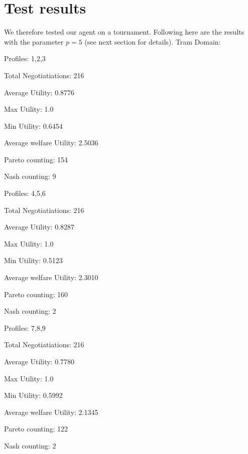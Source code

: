 \documentclass[a4,11pt]{scrartcl}
\let\tempone\itemize
\let\temptwo\enditemize
\renewenvironment{itemize}{\tempone\addtolength{\itemsep}{-0.5\baselineskip}}{\temptwo}
\begin{document}
\section{Test results}
We therefore tested our agent on a tournament. Following here are the results with the parameter $p=5$ (see next section for details).
Tram Domain:
\begin{itemize}

  \item Profiles: 1,2,3
  \begin{itemize}
  \item Total Negotiatiations: 216
  \item Average Utility: 0.8776
  \item Max Utility: 1.0
  \item Min Utility: 0.6454
  \item Average welfare Utility: 2.5036
  \item Pareto counting: 154
  \item Nash counting: 9
\end{itemize}

  \item Profiles: 4,5,6
  \begin{itemize}
  \item Total Negotiatiations: 216
  \item Average Utility: 0.8287
  \item Max Utility: 1.0
  \item Min Utility: 0.5123
  \item Average welfare Utility: 2.3010
  \item Pareto counting: 160
  \item Nash counting: 2
\end{itemize}

  \item Profiles: 7,8,9
  \begin{itemize}
  \item Total Negotiatiations: 216
  \item Average Utility: 0.7780
  \item Max Utility: 1.0
  \item Min Utility: 0.5992
  \item Average welfare Utility: 2.1345
  \item Pareto counting: 122
  \item Nash counting: 2
\end{itemize}
\end{itemize}
\end{document}
